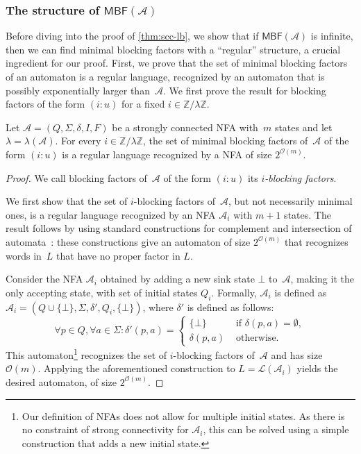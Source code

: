 \documentclass[letterpaper, USenglish, cleveref, autoref, thm-restate, numberwithinsect]{lipics-v2021}
\theoremstyle{theorem}
\theoremstyle{definition}
\newcommand{\Aa}{\mathcal{A}}
\newcommand{\cO}{\mathcal{O}}
\newcommand{\lang}[1]{\mathcal{L}(#1)}
\newcommand{\MBF}{\textsf{MBF}\xspace}
\newcommand{\timedword}[2]{(#1:#2)}
\newcommand{\ZZ}{\mathbb{Z}}
\begin{document}
\subsubsection{The structure of $\MBF(\Aa)$}
Before diving into the proof of \cref{thm:scc-lb}, we show that if $\MBF(\Aa)$ is infinite, then we can find minimal blocking factors with a ``regular'' structure, a crucial ingredient for our proof.
First, we prove that the set of minimal blocking factors of an automaton is a regular language, recognized by an automaton that is possibly exponentially larger than~$\Aa$.
We first prove the result for blocking factors of the form $\timedword{i}{u}$ for a fixed $i\in\ZZ/\lambda\ZZ$.
\begin{lemma}\label{lemma:blocking-regular}
    Let $\Aa = (Q, \Sigma, \delta, I, F)$ be a strongly connected NFA with~$m$ states and let $\lambda = \lambda(\Aa)$.
    For every $i \in\ZZ/\lambda\ZZ$, the set of minimal blocking factors of~$\Aa$ of the form $\timedword{i}{u}$ is a regular language recognized by a NFA of size $2^{\cO(m)}$.
\end{lemma}
\begin{proof}
    We call blocking factors of~$\Aa$ of the form $\timedword{i}{u}$ its \emph{$i$-blocking factors}.
    
    We first show that the set of $i$-blocking factors of~$\Aa$, but not necessarily minimal ones, is a regular language recognized by an NFA $\Aa_i$ with $m+1$ states. The result follows by using standard constructions for complement and intersection of automata~\cite[Chapter 1, Section 3]{Pin2021}: these constructions give an automaton of size $2^{\cO(m)}$ that recognizes words in~$L$ that have no proper factor in $L$.

    Consider the NFA $\Aa_i$ obtained by adding a new sink state $\bot$ to~$\Aa$,
    making it the only accepting state, with set of initial states $Q_i$.
    Formally, $\Aa_i$ is defined as $\Aa_i = (Q \cup \{\bot\}, \Sigma, \delta', Q_i, \{\bot\})$,
    where $\delta'$ is defined as follows:
    \[
        \forall p\in Q, \forall a\in\Sigma: \delta'(p, a) = \begin{cases}
            \{\bot\}& \text{ if } \delta(p,a) = \emptyset, \\
            \delta(p,a) & \text{ otherwise.}
        \end{cases}
    \]
    This automaton\footnote{Our definition of NFAs does not allow for multiple initial states. As there is no constraint of strong connectivity for $\Aa_i$, this can be solved using a simple construction that adds a new initial state.} recognizes the set of $i$-blocking factors of~$\Aa$ and has size $\cO(m)$.
    Applying the aforementioned construction to $L = \lang{\Aa_i}$ yields the desired automaton, of size $2^{\cO(m)}$.
\end{proof}
\end{document}
